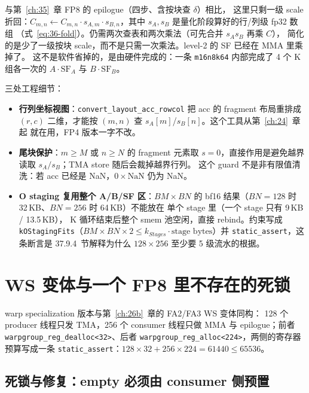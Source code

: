 与第~\ref{ch:35}~章 FP8 的 epilogue（四步、含按块查 $\delta$）相比，
这里只剩一级 scale 折回：$C_{m,n} \leftarrow C_{m,n}\cdot
s_{A,m}\cdot s_{B,n}$，其中 $s_A,s_B$ 是量化阶段算好的行/列级 fp32 数组
（式~\ref{eq:36-fold}）。仍需两次查表和两次乘法（可先合并 $s_As_B$ 再乘 $C$），
简化的是少了一级按块 scale，而不是只需一次乘法。level-2 的 SF 已经在 MMA 里乘掉了。
这不是软件省掉的，是由硬件完成的：一条
\texttt{m16n8k64} 内部完成了 4 个 K 组各一次的 $A\cdot\mathrm{SF}_A$ 与
$B\cdot\mathrm{SF}_B$。

三处工程细节：

\begin{itemize}[itemsep=2pt,topsep=3pt]
  \item \textbf{行列坐标视图}：\texttt{convert\_layout\_acc\_rowcol}
        把 acc 的 fragment 布局重排成 $(r,c)$ 二维，才能按
        $(m,n)$ 查 $s_A[m]$/$s_B[n]$。这个工具从第~\ref{ch:24}~章起
        就在用，FP4 版本一字不改。
  \item \textbf{尾块保护}：$m\ge M$ 或 $n\ge N$ 的 fragment 元素取
        $s=0$，直接作用是避免越界读取 $s_A/s_B$；TMA store 随后会裁掉越界行列。
        这个 guard 不是非有限值清洗：若 acc 已经是 NaN，$0\times\mathrm{NaN}$ 仍为 NaN。
  \item \textbf{O staging 复用整个 A/B/SF 区}：$BM\times BN$ 的 bf16
        结果（$BN{=}128$ 时 32\,KB、$BN{=}256$ 时 64\,KB）不能放在
        单个 stage 里（一个 stage 只有 9\,KB / 13.5\,KB），
        K 循环结束后整个 smem 池空闲，直接 rebind。约束写成
        \texttt{kOStagingFits}（$BM\times BN\times 2 \le k_{Stages}\cdot
        \text{stage bytes}$）并 \texttt{static\_assert}，这条断言是
        37.9.4~节解释为什么 $128\times256$ 至少要 5 级流水的根据。
\end{itemize}

\section{WS 变体与一个 FP8 里不存在的死锁}\label{sec:37-ws}

warp specialization 版本与第~\ref{ch:26b}~章的 FA2/FA3 WS 变体同构：
128 个 producer 线程只发 TMA，256 个 consumer 线程只做 MMA 与
epilogue；前者 \texttt{warpgroup\_reg\_dealloc<32>}、后者
\texttt{warpgroup\_reg\_alloc<224>}，两侧的寄存器预算写成一条
\texttt{static\_assert}：$128\times32 + 256\times224 = 61440\le 65536$。

\subsection{死锁与修复：empty 必须由 consumer 侧预置}

